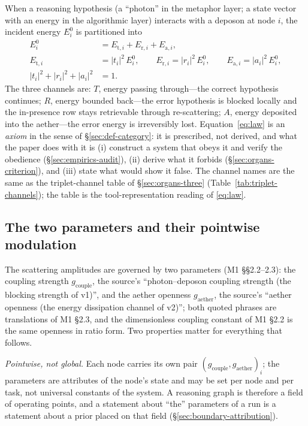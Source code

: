 \documentclass[11pt,a4paper]{article}
\newcommand{\Ezero}{E^{0}}
\newcommand{\gcouple}{g_{\mathrm{couple}}}
\newcommand{\gaether}{g_{\mathrm{aether}}}
\begin{document}
When a reasoning hypothesis (a ``photon'' in the metaphor layer; a state vector with an energy in the algorithmic layer) interacts with a deposon at node $i$, the incident energy $\Ezero_i$ is partitioned into
\begin{align}
\Ezero_i &= E_{\mathrm{t},i} + E_{\mathrm{r},i} + E_{\mathrm{a},i}, \label{eq:law}\\
E_{\mathrm{t},i} &= |t_i|^2\,\Ezero_i, \qquad E_{\mathrm{r},i} = |r_i|^2\,\Ezero_i, \qquad E_{\mathrm{a},i} = |a_i|^2\,\Ezero_i, \label{eq:channels}\\
|t_i|^2 + |r_i|^2 + |a_i|^2 &= 1 . \label{eq:allocation}
\end{align}
The three channels are: $T$, energy passing through---the correct hypothesis continues; $R$, energy bounded back---the error hypothesis is blocked locally and the in-presence row stays retrievable through re-scattering; $A$, energy deposited into the aether---the error energy is irreversibly lost. Equation~\eqref{eq:law} is an \emph{axiom} in the sense of \S\ref{sec:def-category}: it is prescribed, not derived, and what the paper does with it is (i) construct a system that obeys it and verify the obedience (\S\ref{sec:empirics-audit}), (ii) derive what it forbids (\S\ref{sec:organs-criterion}), and (iii) state what would show it false. The channel names are the same as the triplet-channel table of \S\ref{sec:organs-three} (Table~\ref{tab:triplet-channels}); the table is the tool-representation reading of \eqref{eq:law}.

\subsection{The two parameters and their pointwise modulation}
\label{sec:framework-parameters}

The scattering amplitudes are governed by two parameters (M1 §§2.2--2.3): the coupling strength $\gcouple$, the source's ``photon--deposon coupling strength (the blocking strength of v1)'', and the aether openness $\gaether$, the source's ``aether openness (the energy dissipation channel of v2)''; both quoted phrases are translations of M1 §2.3, and the dimensionless coupling constant of M1 §2.2 is the same openness in ratio form. Two properties matter for everything that follows.

\emph{Pointwise, not global.} Each node carries its own pair $(\gcouple,\gaether)_{i}$; the parameters are attributes of the node's state and may be set per node and per task, not universal constants of the system. A reasoning graph is therefore a field of operating points, and a statement about ``the'' parameters of a run is a statement about a prior placed on that field (\S\ref{sec:boundary-attribution}).
\end{document}
